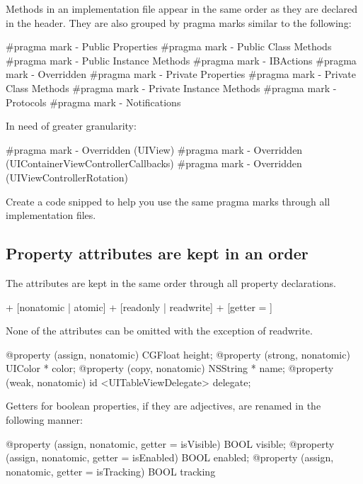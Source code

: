 \documentclass[10pt]{extarticle}
\newenvironment{codelisting}
{\footnotesize\mdframed[middlelinewidth=0.5pt, middlelinecolor=BaliHaiColor, skipabove=15pt]\verbatim}
{\endverbatim\endmdframed\vspace{12pt}\normalsize}
\newenvironment{tiplisting}
{\small\mdframed[middlelinewidth=0.5pt, middlelinecolor=GoldenDreamColor, skipabove=15pt]{\textbf{Tip:}}}
{\endmdframed\vspace{12pt}\normalsize}
\begin{document}
Methods in an implementation file appear in the same order as they are declared in the header. They are also grouped by pragma marks similar to the following:

\begin{codelisting}
#pragma mark - Public Properties
#pragma mark - Public Class Methods
#pragma mark - Public Instance Methods
#pragma mark - IBActions
#pragma mark - Overridden
#pragma mark - Private Properties
#pragma mark - Private Class Methods
#pragma mark - Private Instance Methods
#pragma mark - Protocols
#pragma mark - Notifications
\end{codelisting}

In need of greater granularity:

\begin{codelisting}
#pragma mark - Overridden (UIView)
#pragma mark - Overridden (UIContainerViewControllerCallbacks)
#pragma mark - Overridden (UIViewControllerRotation)
\end{codelisting}

\begin{tiplisting}
Create a code snipped to help you use the same pragma marks through all implementation files.
\end{tiplisting}

\subsection{Property attributes are kept in an order}
The attributes are kept in the same order through all property declarations.

\begin{codelisting}
[assign | weak | strong | copy] + [nonatomic | atomic] + [readonly | readwrite] + [getter = ]
\end{codelisting}

None of the attributes can be omitted with the exception of readwrite.

\begin{codelisting}
@property (assign, nonatomic) CGFloat height;
@property (strong, nonatomic) UIColor * color;
@property (copy, nonatomic) NSString * name;
@property (weak, nonatomic) id <UITableViewDelegate> delegate;
\end{codelisting}

Getters for boolean properties, if they are adjectives, are renamed in the following manner:

\begin{codelisting}
@property (assign, nonatomic, getter = isVisible) BOOL visible;
@property (assign, nonatomic, getter = isEnabled) BOOL enabled;
@property (assign, nonatomic, getter = isTracking) BOOL tracking
\end{codelisting}
\end{document}
